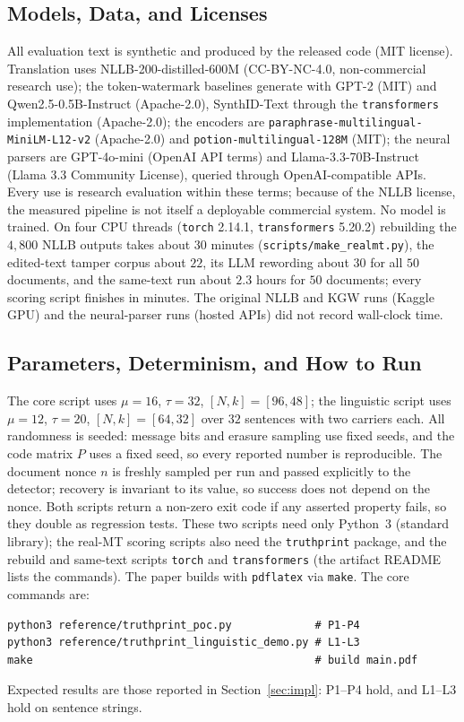 \documentclass[journal]{IEEEtran}
\begin{document}
\subsection{Models, Data, and Licenses}
All evaluation text is synthetic and produced by the released code (MIT license). Translation uses NLLB-200-distilled-600M \cite{nllb2024} (CC-BY-NC-4.0, non-commercial research use); the token-watermark baselines generate with GPT-2 (MIT) and Qwen2.5-0.5B-Instruct (Apache-2.0), SynthID-Text through the \texttt{transformers} implementation (Apache-2.0); the encoders are \texttt{paraphrase-multilingual-MiniLM-L12-v2} (Apache-2.0) and \texttt{potion-multilingual-128M} (MIT); the neural parsers are GPT-4o-mini (OpenAI API terms) and Llama-3.3-70B-Instruct (Llama 3.3 Community License), queried through OpenAI-compatible APIs. Every use is research evaluation within these terms; because of the NLLB license, the measured pipeline is not itself a deployable commercial system. No model is trained. On four CPU threads (\texttt{torch} 2.14.1, \texttt{transformers} 5.20.2) rebuilding the $4{,}800$ NLLB outputs takes about $30$ minutes (\texttt{scripts/\allowbreak make\_realmt.py}), the edited-text tamper corpus about $22$, its LLM rewording about $30$ for all $50$ documents, and the same-text run about $2.3$ hours for $50$ documents; every scoring script finishes in minutes. The original NLLB and KGW runs (Kaggle GPU) and the neural-parser runs (hosted APIs) did not record wall-clock time.

\subsection{Parameters, Determinism, and How to Run}
The core script uses $\mu=16$, $\tau=32$, $[N,k]=[96,48]$; the linguistic script uses $\mu=12$, $\tau=20$, $[N,k]=[64,32]$ over $32$ sentences with two carriers each. All randomness is seeded: message bits and erasure sampling use fixed seeds, and the code matrix $P$ uses a fixed seed, so every reported number is reproducible. The document nonce $n$ is freshly sampled per run and passed explicitly to the detector; recovery is invariant to its value, so success does not depend on the nonce. Both scripts return a non-zero exit code if any asserted property fails, so they double as regression tests. These two scripts need only Python~3 (standard library); the real-MT scoring scripts also need the \texttt{truthprint} package, and the rebuild and same-text scripts \texttt{torch} and \texttt{transformers} (the artifact README lists the commands). The paper builds with \texttt{pdflatex} via \texttt{make}. The core commands are:
\begin{lstlisting}
python3 reference/truthprint_poc.py             # P1-P4
python3 reference/truthprint_linguistic_demo.py # L1-L3
make                                            # build main.pdf
\end{lstlisting}
Expected results are those reported in Section~\ref{sec:impl}: P1--P4 hold, and L1--L3 hold on sentence strings.
\end{document}
